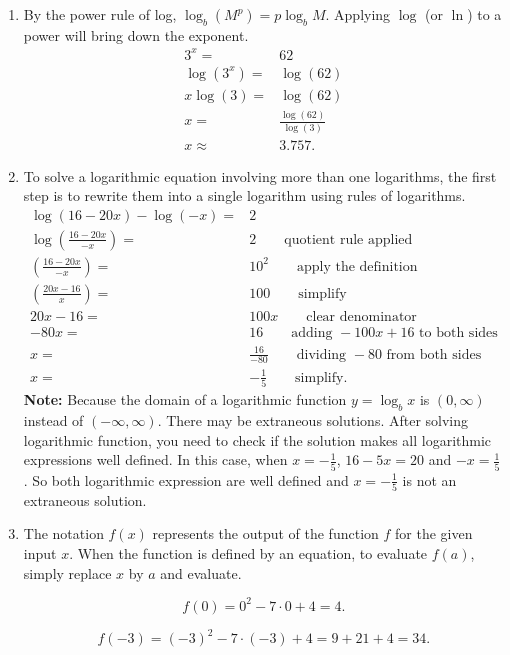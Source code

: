 \documentclass[
  12pt]{article}
\begin{document}
\begin{enumerate}
\def\labelenumi{\arabic{enumi}.}
\setcounter{enumi}{19}
\item
  By the power rule of log, \(\log_b(M^p)=p\log_bM\). Applying \(\log\)
  (or \(\ln\)) to a power will bring down the exponent. \[
  \begin{aligned}
  3^x=&62\\
  \log(3^x)=&\log(62)\\
  x\log(3)=&\log(62)\\
  x=&\frac{\log(62)}{\log(3)}\\
  x\approx & 3.757.
  \end{aligned}
  \]
\item
  To solve a logarithmic equation involving more than one logarithms,
  the first step is to rewrite them into a single logarithm using rules
  of logarithms. \[
  \begin{aligned}
  \log(16-20x)-\log(-x)=&2\\
  \log\left(\frac{16-20x}{-x}\right)=&2\qquad \text{quotient rule applied}\\
  \left(\frac{16-20x}{-x}\right)=&10^2\qquad \text{apply the definition}\\
  \left(\frac{20x-16}{x}\right)=&100 \qquad \text{simplify}\\
  20x-16=&100x \qquad \text{clear denominator}\\
  -80x=&16 \qquad \text{adding } -100x+16 \text{ to both sides}\\
  x=&\frac{16}{-80} \qquad \text{dividing } -80 \text{ from both sides}\\
  x=&-\frac{1}{5} \qquad \text{simplify}.
  \end{aligned}
  \] \textbf{Note:} Because the domain of a logarithmic function
  \(y=\log_bx\) is \((0, \infty)\) instead of \((-\infty,\infty)\).
  There may be extraneous solutions. After solving logarithmic function,
  you need to check if the solution makes all logarithmic expressions
  well defined. In this case, when \(x=-\frac15\), \(16-5x=20\) and
  \(-x=\frac15\). So both logarithmic expression are well defined and
  \(x=-\frac15\) is not an extraneous solution.
\item
  The notation \(f(x)\) represents the output of the function \(f\) for
  the given input \(x\). When the function is defined by an equation, to
  evaluate \(f(a)\), simply replace \(x\) by \(a\) and evaluate.

  \[f(0)=0^2-7\cdot 0 +4=4.\]

  \[f(-3)=(-3)^2-7\cdot (-3) + 4=9+21+4=34.\]


\end{enumerate}
\end{document}
